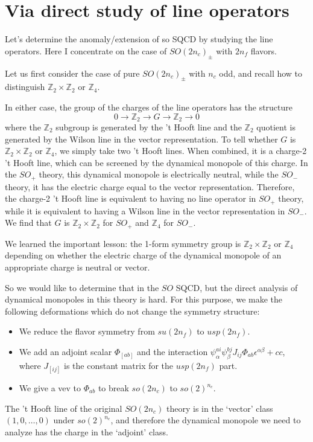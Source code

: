 \documentclass[12pt]{article}
\numberwithin{equation}{section}
\def\bZ{\mathbb{Z}}
\begin{document}
\section{Via direct study of line operators}

Let's determine the anomaly/extension of so SQCD by studying the line operators.
Here I concentrate on the case of $SO(2n_c)_\pm$ with $2n_f$ flavors.

Let us first consider the case of pure $SO(2n_c)_\pm$ with $n_c$ odd,
and recall how to distinguish $\bZ_2\times \bZ_2$ or $\bZ_4$.

In either case, the group of the charges of the line operators has the structure \[
0\to \bZ_2 \to G \to \bZ_2 \to 0
\] where the $\bZ_2$ subgroup is generated by the 't Hooft line
and the $\bZ_2$ quotient is generated by the Wilson line in the vector representation.
To tell whether $G$ is $\bZ_2\times \bZ_2$ or $\bZ_4$,
we simply take two 't Hooft lines.
When combined, it is a charge-2 't Hooft line, which can be screened by the dynamical monopole of this charge.
In the $SO_+$ theory, this dynamical monopole is electrically neutral,
while the $SO_-$ theory, it has the electric charge equal to the vector representation.
Therefore, the charge-2 't Hooft line is equivalent to having no line operator in $SO_+$ theory,
while it is equivalent to having a Wilson line in the vector representation in $SO_-$.
We find that $G$ is $\bZ_2\times \bZ_2$ for $SO_+$ and $\bZ_4$ for $SO_-$.

We learned the important lesson: 
the 1-form symmetry group is $\bZ_2\times \bZ_2$ or $\bZ_4$ depending on 
whether the electric charge of the dynamical monopole of an appropriate charge is 
neutral or vector.

So we would like to determine that in the $SO$ SQCD,
but the direct analysis of dynamical monopoles in this theory is hard.
For this purpose, we make the following deformations which do not change the symmetry structure:
\begin{itemize}
\item We reduce the flavor symmetry from $su(2n_f)$ to $usp(2n_f)$.
\item We add an adjoint scalar $\Phi_{[ab]}$ and the interaction $\psi^{ai}_\alpha \psi^{bj}_\beta J_{ij} \Phi_{ab}\epsilon^{\alpha\beta} +cc$, where $J_{[ij]}$ is the constant matrix for the $usp(2n_f)$ part.
\item We give a vev to $\Phi_{ab}$ to break $so(2n_c)$ to $so(2)^{n_c}$.
\end{itemize}
The 't Hooft line of the original $SO(2n_c)$ theory is in the `vector' class
$(1,0,\ldots,0)$ under $so(2)^{n_c}$,
and therefore the dynamical monopole we need to analyze has the charge in the `adjoint' class.
\end{document}
